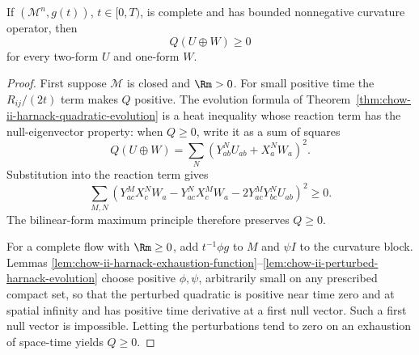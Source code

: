 \begin{theorem}
\label{thm:chow-ii-hamilton-matrix-harnack}
If \((\mathcal M^n,g(t))\), \(t\in[0,T)\), is complete and has bounded
nonnegative curvature operator, then
\[
Q(U\oplus W)\ge0
\]
for every two-form \(U\) and one-form \(W\).
\end{theorem}
\begin{proof}
\sketch First suppose \(\mathcal M\) is closed and \(\Rm>0\).  For small positive
time the \(R_{ij}/(2t)\) term makes \(Q\) positive.  The evolution formula of
Theorem~\ref{thm:chow-ii-harnack-quadratic-evolution} is a heat inequality
whose reaction term has the null-eigenvector property: when \(Q\ge0\), write
it as a sum of squares
\[
Q(U\oplus W)=\sum_N(Y^N_{ab}U_{ab}+X^N_aW_a)^2.
\]
Substitution into the reaction term gives
\[
\sum_{M,N}(Y^M_{ac}X^N_cW_a-Y^N_{ac}X^M_cW_a
-2Y^M_{ac}Y^N_{bc}U_{ab})^2\ge0.
\]
The bilinear-form maximum principle therefore preserves \(Q\ge0\).

For a complete flow with \(\Rm\ge0\), add \(t^{-1}\phi g\) to \(M\) and
\(\psi I\) to the curvature block.  Lemmas
\ref{lem:chow-ii-harnack-exhaustion-function}--\ref{lem:chow-ii-perturbed-harnack-evolution}
choose positive \(\phi,\psi\), arbitrarily small on any prescribed compact
set, so that the perturbed quadratic is positive near time zero and at spatial
infinity and has positive time derivative at a first null vector.  Such a
first null vector is impossible.  Letting the perturbations tend to zero on
an exhaustion of space-time yields \(Q\ge0\).
\end{proof}

